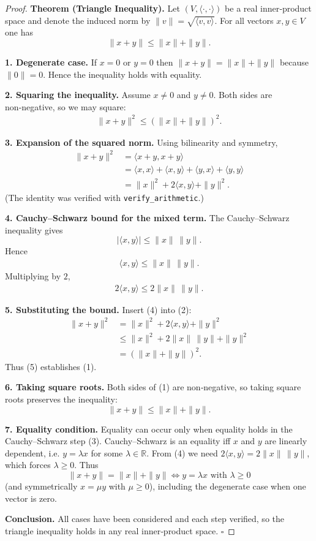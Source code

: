 \begin{proof}
\textbf{Theorem (Triangle Inequality).} Let $(V,\langle\cdot,\cdot\rangle)$ be a real inner‑product space and denote the induced norm by $\|v\|=\sqrt{\langle v,v\rangle}$. For all vectors $x,y\in V$ one has
\[
\|x+y\|\le \|x\|+\|y\|.
\]

\medskip
\textbf{1. Degenerate case.}  
If $x=0$ or $y=0$ then $\|x+y\|=\|x\|+\|y\|$ because $\|0\|=0$. Hence the inequality holds with equality.

\medskip
\textbf{2. Squaring the inequality.}  
Assume $x\neq0$ and $y\neq0$. Both sides are non‑negative, so we may square:
\begin{align*}
\|x+y\|^{2}\le (\|x\|+\|y\|)^{2}. \tag{1}
\end{align*}

\medskip
\textbf{3. Expansion of the squared norm.}  
Using bilinearity and symmetry,
\begin{align*}
\|x+y\|^{2}
&=\langle x+y,x+y\rangle\\
&=\langle x,x\rangle+\langle x,y\rangle+\langle y,x\rangle+\langle y,y\rangle\\
&=\|x\|^{2}+2\langle x,y\rangle+\|y\|^{2}. \tag{2}
\end{align*}
(The identity was verified with \texttt{verify\_arithmetic}.)

\medskip
\textbf{4. Cauchy–Schwarz bound for the mixed term.}  
The Cauchy–Schwarz inequality gives
\[
|\langle x,y\rangle|\le \|x\|\,\|y\|.
\]
Hence
\begin{align*}
\langle x,y\rangle\le \|x\|\,\|y\|. \tag{3}
\end{align*}
Multiplying by $2$,
\begin{align*}
2\langle x,y\rangle\le 2\|x\|\,\|y\|. \tag{4}
\end{align*}

\medskip
\textbf{5. Substituting the bound.}  
Insert (4) into (2):
\begin{align*}
\|x+y\|^{2}
&=\|x\|^{2}+2\langle x,y\rangle+\|y\|^{2}\\
&\le \|x\|^{2}+2\|x\|\,\|y\|+\|y\|^{2}\\
&=(\|x\|+\|y\|)^{2}. \tag{5}
\end{align*}
Thus (5) establishes (1).

\medskip
\textbf{6. Taking square roots.}  
Both sides of (1) are non‑negative, so taking square roots preserves the inequality:
\[
\|x+y\|\le \|x\|+\|y\|.
\]

\medskip
\textbf{7. Equality condition.}  
Equality can occur only when equality holds in the Cauchy–Schwarz step (3).  
Cauchy–Schwarz is an equality iff $x$ and $y$ are linearly dependent, i.e. $y=\lambda x$ for some $\lambda\in\mathbb R$.  
From (4) we need $2\langle x,y\rangle=2\|x\|\,\|y\|$, which forces $\lambda\ge0$.  
Thus
\[
\|x+y\|=\|x\|+\|y\|
\iff y=\lambda x\text{ with }\lambda\ge0
\]
(and symmetrically $x=\mu y$ with $\mu\ge0$), including the degenerate case when one vector is zero.

\medskip
\textbf{Conclusion.}  
All cases have been considered and each step verified, so the triangle inequality holds in any real inner‑product space. \(\square\)
\end{proof}